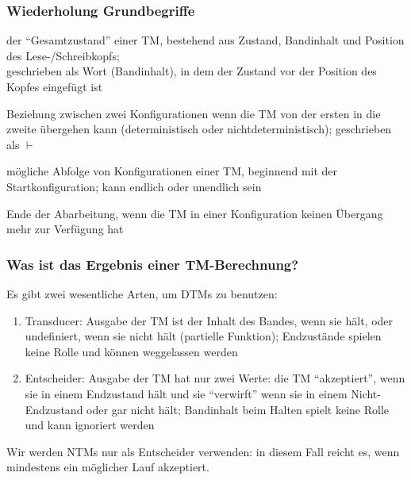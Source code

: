 \documentclass[aspectratio=1610,onlymath]{beamer}
\begin{document}
\begin{frame}\frametitle{Wiederholung Grundbegriffe}

 der "`Gesamtzustand"' einer TM, bestehend aus Zustand, Bandinhalt und Position des Lese-/Schreibkopfs;\\[1ex]
geschrieben als Wort (Bandinhalt), in dem der Zustand vor der Position des Kopfes eingefügt ist
\bigskip

 Beziehung zwischen zwei Konfigurationen wenn die TM von der ersten in die zweite übergehen kann (deterministisch oder nichtdeterministisch); geschrieben als $\vdash$
\bigskip

 mögliche Abfolge von Konfigurationen einer TM, beginnend mit der Startkonfiguration; kann endlich oder unendlich sein
\bigskip

 Ende der Abarbeitung, wenn die TM in einer Konfiguration keinen Übergang mehr zur Verfügung hat

\end{frame}

\begin{frame}\frametitle{Was ist das Ergebnis einer TM-Berechnung?}

Es gibt zwei wesentliche Arten, um DTMs zu benutzen:

\begin{enumerate}[(1)]
\item \alert{Transducer:} Ausgabe der TM ist der Inhalt des Bandes, wenn sie hält, oder undefiniert, wenn sie nicht hält (partielle Funktion); Endzustände spielen keine Rolle und können weggelassen werden
\item \alert{Entscheider:} Ausgabe der TM hat nur zwei Werte: die TM "`akzeptiert"', wenn sie in einem Endzustand hält und sie "`verwirft"' wenn sie in einem Nicht-Endzustand oder gar nicht hält;
Bandinhalt beim Halten spielt keine Rolle und kann ignoriert werden
\end{enumerate}

Wir werden NTMs nur als Entscheider verwenden: in diesem Fall reicht es, wenn mindestens ein möglicher Lauf akzeptiert.

\end{frame}
\end{document}
